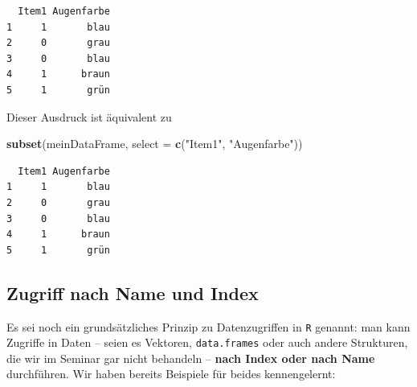 \documentclass[12pt,]{tufte-book}
\newenvironment{Shaded}{\begin{snugshade}}{\end{snugshade}}
\newcommand{\KeywordTok}[1]{\textcolor[rgb]{0.13,0.29,0.53}{\textbf{#1}}}
\newcommand{\DataTypeTok}[1]{\textcolor[rgb]{0.13,0.29,0.53}{#1}}
\newcommand{\StringTok}[1]{\textcolor[rgb]{0.31,0.60,0.02}{#1}}
\newcommand{\NormalTok}[1]{#1}
\theoremstyle{definition}
\theoremstyle{definition}
\theoremstyle{definition}
\theoremstyle{remark}
\begin{document}
\begin{verbatim}
  Item1 Augenfarbe
1     1       blau
2     0       grau
3     0       blau
4     1      braun
5     1       grün
\end{verbatim}

Dieser Ausdruck ist äquivalent zu

\begin{Shaded}
\begin{Highlighting}[]
\KeywordTok{subset}\NormalTok{(meinDataFrame, }\DataTypeTok{select =} \KeywordTok{c}\NormalTok{(}\StringTok{"Item1"}\NormalTok{, }\StringTok{"Augenfarbe"}\NormalTok{))}
\end{Highlighting}
\end{Shaded}

\begin{verbatim}
  Item1 Augenfarbe
1     1       blau
2     0       grau
3     0       blau
4     1      braun
5     1       grün
\end{verbatim}


\subsection{Zugriff nach Name und
Index}\label{zugriff-nach-name-und-index}

Es sei noch ein grundsätzliches Prinzip zu Datenzugriffen in \texttt{R}
genannt: man kann Zugriffe in Daten -- seien es Vektoren,
\texttt{data.frames} oder auch andere Strukturen, die wir im Seminar gar
nicht behandeln -- \textbf{nach Index oder nach Name} durchführen. Wir
haben bereits Beispiele für beides kennengelernt:
\end{document}
